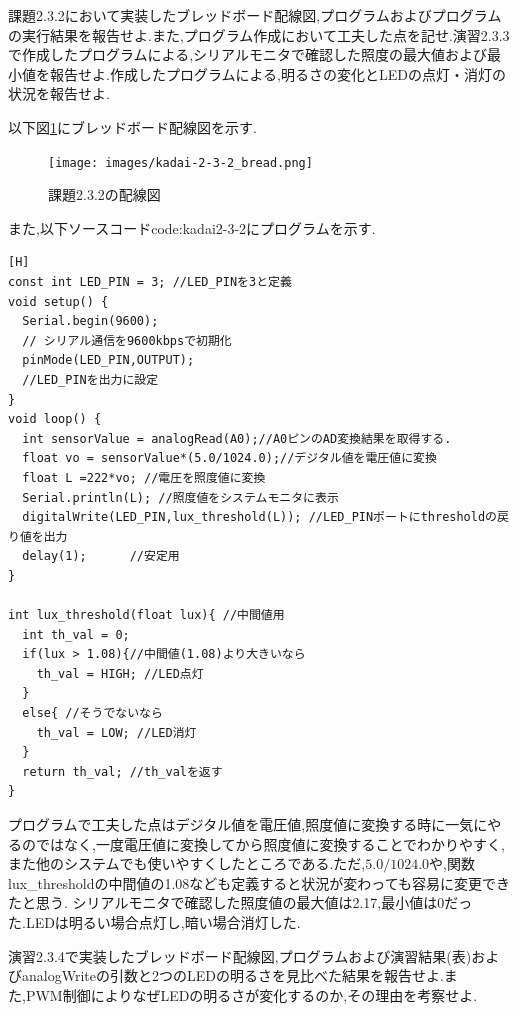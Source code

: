 \documentclass{jarticle}
\begin{document}
課題2.3.2において実装したブレッドボード配線図,プログラムおよびプログラムの実行結果を報告せよ.また,プログラム作成において工夫した点を記せ.演習2.3.3で作成したプログラムによる,シリアルモニタで確認した照度の最大値および最小値を報告せよ.作成したプログラムによる,明るさの変化とLEDの点灯・消灯の状況を報告せよ.

以下図\ref{fig:kadai2-3-2bread}にブレッドボード配線図を示す.

\begin{figure}[H]
\begin{center}
\texttt{[image: images/kadai-2-3-2\_bread.png]}
\caption{課題2.3.2の配線図}
\label{fig:kadai2-3-2bread}
\end{center}
\end{figure}

また,以下ソースコード{code:kadai2-3-2}にプログラムを示す.

\begin{lstlisting}[caption = 課題2.3.2,label=code:kadai2-3-2][H]
const int LED_PIN = 3; //LED_PINを3と定義
void setup() {
  Serial.begin(9600);
  // シリアル通信を9600kbpsで初期化
  pinMode(LED_PIN,OUTPUT);
  //LED_PINを出力に設定
}
void loop() {
  int sensorValue = analogRead(A0);//A0ピンのAD変換結果を取得する.
  float vo = sensorValue*(5.0/1024.0);//デジタル値を電圧値に変換
  float L =222*vo; //電圧を照度値に変換
  Serial.println(L); //照度値をシステムモニタに表示
  digitalWrite(LED_PIN,lux_threshold(L)); //LED_PINポートにthresholdの戻り値を出力
  delay(1);      //安定用 
}

int lux_threshold(float lux){ //中間値用
  int th_val = 0;
  if(lux > 1.08){//中間値(1.08)より大きいなら
    th_val = HIGH; //LED点灯
  }
  else{ //そうでないなら
    th_val = LOW; //LED消灯
  }
  return th_val; //th_valを返す
}
\end{lstlisting}

プログラムで工夫した点はデジタル値を電圧値,照度値に変換する時に一気にやるのではなく,一度電圧値に変換してから照度値に変換することでわかりやすく,また他のシステムでも使いやすくしたところである.ただ,$5.0/1024.0$や,関数lux_thresholdの中間値の1.08なども定義すると状況が変わっても容易に変更できたと思う.
シリアルモニタで確認した照度値の最大値は2.17,最小値は0だった.LEDは明るい場合点灯し,暗い場合消灯した.


演習2.3.4で実装したブレッドボード配線図,プログラムおよび演習結果(表)およびanalogWriteの引数と2つのLEDの明るさを見比べた結果を報告せよ.また,PWM制御によりなぜLEDの明るさが変化するのか,その理由を考察せよ.
\end{document}
